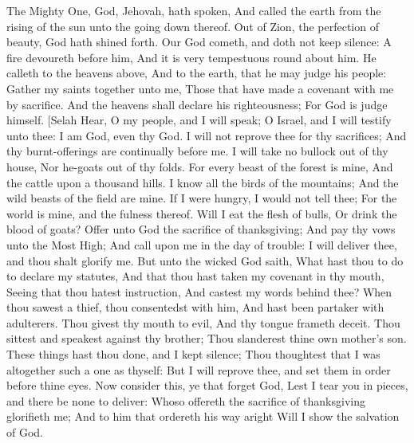 The Mighty One, God, Jehovah, hath spoken, And called the earth from the rising of the sun unto the going down thereof.  Out of Zion, the perfection of beauty, God hath shined forth.  Our God cometh, and doth not keep silence: A fire devoureth before him, And it is very tempestuous round about him.  He calleth to the heavens above, And to the earth, that he may judge his people:  Gather my saints together unto me, Those that have made a covenant with me by sacrifice.  And the heavens shall declare his righteousness; For God is judge himself. [Selah  Hear, O my people, and I will speak; O Israel, and I will testify unto thee: I am God, even thy God.  I will not reprove thee for thy sacrifices; And thy burnt-offerings are continually before me.  I will take no bullock out of thy house, Nor he-goats out of thy folds.  For every beast of the forest is mine, And the cattle upon a thousand hills.  I know all the birds of the mountains; And the wild beasts of the field are mine.  If I were hungry, I would not tell thee; For the world is mine, and the fulness thereof.  Will I eat the flesh of bulls, Or drink the blood of goats?  Offer unto God the sacrifice of thanksgiving; And pay thy vows unto the Most High;  And call upon me in the day of trouble: I will deliver thee, and thou shalt glorify me.  But unto the wicked God saith, What hast thou to do to declare my statutes, And that thou hast taken my covenant in thy mouth,  Seeing that thou hatest instruction, And castest my words behind thee?  When thou sawest a thief, thou consentedst with him, And hast been partaker with adulterers.  Thou givest thy mouth to evil, And thy tongue frameth deceit.  Thou sittest and speakest against thy brother; Thou slanderest thine own mother’s son.  These things hast thou done, and I kept silence; Thou thoughtest that I was altogether such a one as thyself: But I will reprove thee, and set them in order before thine eyes.  Now consider this, ye that forget God, Lest I tear you in pieces, and there be none to deliver:  Whoso offereth the sacrifice of thanksgiving glorifieth me; And to him that ordereth his way aright Will I show the salvation of God. 

